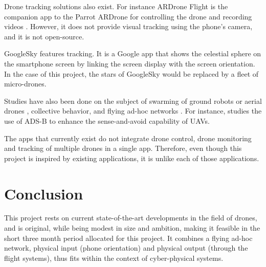 \documentclass[10pt,letterpaper]{article}
\begin{document}
Drone tracking solutions also exist. For instance ARDrone Flight is the companion app to the Parrot ARDrone for controlling the drone and recording videos \cite{ARDroneFlight,ARDrone}. However, it does not provide visual tracking using the phone's camera, and it is not open-source. 

GoogleSky \cite{GoogleSky} features tracking. It is a Google app that shows  the celestial sphere on the smartphone screen by linking the screen display with the screen orientation. In the case of this project, the stars of GoogleSky would be replaced by a fleet of micro-drones. 

Studies have also been done on the subject of swarming of ground robots or aerial drones \cite{Vasarhelyi14}, collective behavior, and flying ad-hoc networks \cite{VeyPRG14, RoyerPG13}. For instance, \cite{Sampigethaya12} studies the use of ADS-B to enhance the sense-and-avoid capability of UAVs.

The apps that currently exist do not integrate drone control, drone monitoring and tracking of multiple drones in a single app. Therefore, even though this project is inspired by existing applications, it is unlike each of those applications.

\section*{Conclusion}
This project rests on current state-of-the-art developments in the field of drones, and is original, while being modest in size and ambition, making it feasible in the short three month period allocated for this project. It combines a flying ad-hoc network, physical input (phone orientation) and physical output (through the flight systems), thus fits within the context of cyber-physical systems. 



\end{document}
